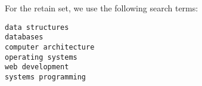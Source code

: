 For the retain set, we use the following search terms:
\begin{lstlisting}
data structures
databases
computer architecture
operating systems
web development
systems programming
\end{lstlisting}






